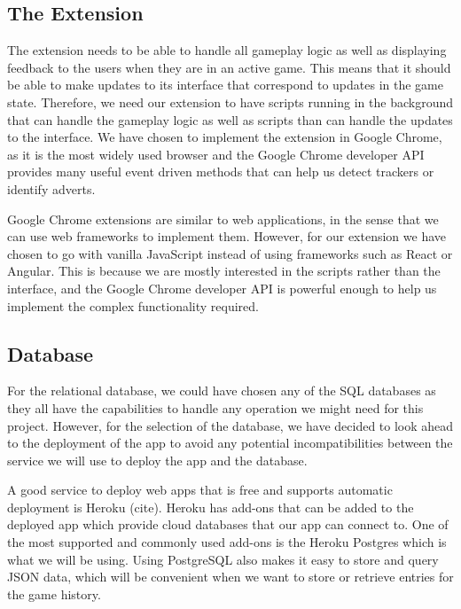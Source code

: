 \documentclass{l4proj}
\begin{document}
\subsection{The Extension}
The extension needs to be able to handle all gameplay logic as well as displaying feedback to the users when they are in an active game. This means that it should be able to make updates to its interface that correspond to updates in the game state.
Therefore, we need our extension to have scripts running in the background that can handle the gameplay logic as well as scripts than can handle the updates to the interface. We have chosen to implement the extension in Google Chrome, as it is the
most widely used browser and the Google Chrome developer API provides many useful event driven methods that can help us detect trackers or identify adverts.

Google Chrome extensions are similar to web applications, in the sense that we can use web frameworks to implement them. However, for our extension we have chosen to go with vanilla JavaScript instead of using frameworks such as React or Angular.
This is because we are mostly interested in the scripts rather than the interface, and the Google Chrome developer API is powerful enough to help us implement the complex functionality required.

\subsection{Database}
For the relational database, we could have chosen any of the SQL databases as they all have the capabilities to handle any operation we might need for this project. However, for the selection of the database, we have decided to look ahead to the deployment of the 
app to avoid any potential incompatibilities between the service we will use to deploy the app and the database. 

A good service to deploy web apps that is free and supports automatic deployment is Heroku (cite). Heroku has add-ons that can be added to the deployed app which provide cloud databases that
our app can connect to. One of the most supported and commonly used add-ons is the Heroku Postgres which is what we will be using. Using PostgreSQL also makes it easy to store and query JSON data, which will be convenient when we want to store or retrieve entries for the game history.

\end{document}
